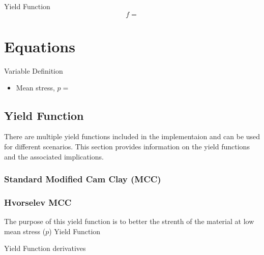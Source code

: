 \documentclass[a4paper,12pt]{article}
\begin{document}

Yield Function
\begin{equation}
    f = 
\end{equation}

\section{Equations}

Variable Definition

\begin{itemize}
    \item Mean stress, $p = \frac{}{}$
\end{itemize}
\subsection{Yield Function}

There are multiple yield functions included in the implementaion and can be used for different scenarios. This section provides information on the yield functions and the associated implications.

\subsubsection{Standard Modified Cam Clay (MCC)}

\subsubsection{Hvorselev MCC}
The purpose of this yield function is to better the strenth of the material at low mean stress ($p$)
Yield Function

Yield Function derivatives








   

\end{document}
